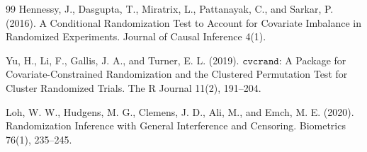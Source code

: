 \documentclass{article}
\begin{document}
\begin{thebibliography}{99}
   Hennessy, J., Dasgupta, T., Miratrix, L., Pattanayak, C., and Sarkar, P. (2016). A Conditional Randomization Test to Account for Covariate Imbalance in Randomized Experiments. Journal of Causal Inference 4(1).

   Yu, H., Li, F., Gallis, J. A., and Turner, E. L. (2019). \(\texttt{cvcrand}\): A Package for Covariate-Constrained Randomization and the Clustered Permutation Test for Cluster Randomized Trials. The R Journal 11(2), 191--204.

   Loh, W. W., Hudgens, M. G., Clemens, J. D., Ali, M., and Emch, M. E. (2020). Randomization Inference with General Interference and Censoring. Biometrics 76(1), 235--245.

\end{thebibliography}
\end{document}
